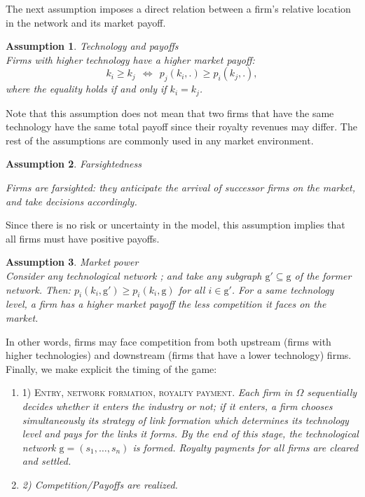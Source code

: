 \documentclass{article}
\newtheorem{assumption}{Assumption}
\begin{document}
\indent The next assumption imposes a direct relation between a firm's relative location in the network and its market payoff.\\  

\begin{assumption}{Technology and payoffs} \label{ass1}\\
Firms with higher technology have a higher market payoff:
\begin{equation*}
     k_i\geq k_j~~ \Leftrightarrow ~~ p_j(k_i,.)\geq  p_i(k_j,.),
\end{equation*}
where the equality holds if and only if $k_i=k_j$.
\end{assumption}

Note that this assumption does not mean that two firms that have the same technology have the same total payoff since their royalty revenues may differ. The rest of the assumptions are commonly used in any market environment. \\

\begin{assumption}{Farsightedness} \label{ass2}

Firms are farsighted: they anticipate the arrival of successor firms on the market, and take decisions accordingly. 
\end{assumption}

Since there is no risk or uncertainty in the model, this assumption implies that all firms must have positive payoffs. 

\begin{assumption}{Market power}\label{ass3}\\
Consider any technological network ; and take any subgraph $\text{g}'\subseteq \text{g}$ of the former network. Then: $p_i(k_i,\text{g}')\geq p_i(k_i,\text{g})$ for all $i\in \text{g}'$. For a same technology level, a firm has a higher market payoff the less competition it faces on the market. 
\end{assumption}

In other words, firms may face competition from both upstream (firms with higher technologies) and downstream (firms that have a lower technology) firms. \\

\indent Finally, we make explicit the timing of the game:       

\begin{enumerate}
    \item[] \textsc{1) Entry, network formation, royalty payment.} \textit{Each firm in $\Omega$ sequentially decides whether it enters the industry or not; if it enters, a firm chooses simultaneously its strategy of link formation which determines its technology level and pays for the links it forms. By the end of this stage, the technological network $\text{g}=(s_1,\ldots,s_n)$ is formed. Royalty payments for all firms are cleared and settled. }
    \item[] \textit{2) Competition/Payoffs are realized.}
\end{enumerate}
\end{document}
